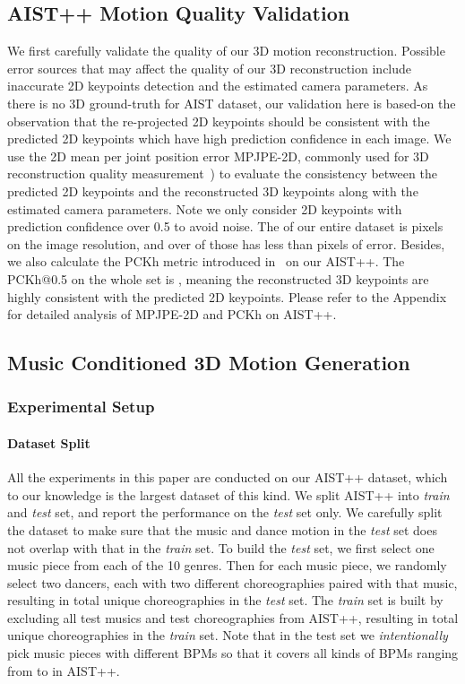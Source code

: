 \subsection{AIST++ Motion Quality Validation}
\label{sec:motion_eval}
We first carefully validate the quality of our 3D motion reconstruction. 
Possible error sources that may affect the quality of our 3D reconstruction include inaccurate 2D keypoints detection and the estimated camera parameters.
As there is no 3D ground-truth for AIST dataset, our validation here is based-on the observation that the re-projected 2D keypoints should be consistent with the predicted 2D keypoints which have high prediction confidence in each image. 
We use the 2D mean per joint position error MPJPE-2D, commonly used for 3D reconstruction quality measurement~\cite{kocabas2019vibe, h36m_pami, multiviewpose}) to evaluate the consistency between the predicted 2D keypoints and the reconstructed 3D keypoints along with the estimated camera parameters. 
Note we only consider 2D keypoints with prediction confidence over 0.5 to avoid noise. 
The  of our entire dataset is  pixels on the  image resolution, and over  of those has less than  pixels of error. 
Besides, we also calculate the PCKh metric introduced in~\cite{andriluka20142d} on our AIST++. The PCKh@0.5 on the whole set is , meaning the reconstructed 3D keypoints are highly consistent with the predicted 2D keypoints. 
Please refer to the Appendix for detailed analysis of MPJPE-2D and PCKh on AIST++.

\subsection{Music Conditioned 3D Motion Generation}

\subsubsection{Experimental Setup}
\paragraph{Dataset Split}
All the experiments in this paper are conducted on our AIST++ dataset, which to our knowledge is the largest dataset of this kind. We split AIST++ into \emph{train} and \emph{test} set, and report the performance on the \emph{test} set only. We carefully split the dataset to make sure that the music and dance motion in the \emph{test} set does not overlap with that in the \emph{train} set. 
To build the \emph{test} set, we first select one music piece from each of the 10 genres. Then for each music piece, we randomly select two dancers, each with two different choreographies paired with that music, resulting in total  unique choreographies in the \emph{test} set. The \emph{train} set is built by excluding all test musics and test choreographies from AIST++, resulting in total  unique choreographies in the \emph{train} set. Note that in the test set we \textit{intentionally} pick music pieces with different BPMs so that it covers all kinds of BPMs ranging from  to  in AIST++.  


